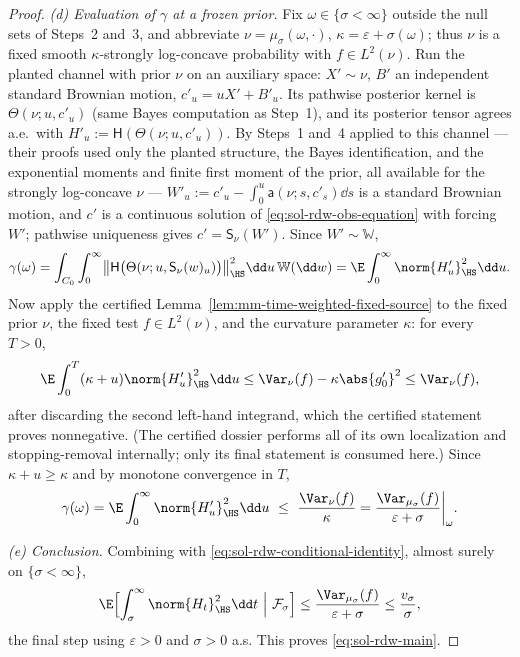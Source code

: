 \documentclass[../main.tex]{subfiles}
\begin{document}
\begin{proof}
\emph{(d) Evaluation of $\gamma$ at a frozen prior.}  Fix
$\omega\in\{\sigma<\infty\}$ outside the null sets of Steps~2 and~3, and abbreviate
$\nu=\mu_\sigma(\omega,\cdot)$, $\kappa=\varepsilon+\sigma(\omega)$; thus $\nu$ is a
fixed smooth $\kappa$-strongly log-concave probability with $f\in L^2(\nu)$.  Run the
planted channel with prior $\nu$ on an auxiliary space: $X'\sim\nu$, $B'$ an
independent standard Brownian motion, $c'_u=uX'+B'_u$.  Its pathwise posterior kernel
is $\Theta(\nu;u,c'_u)$ (same Bayes computation as Step~1), and its posterior tensor
agrees a.e.\ with $H'_u:=\mathsf H(\Theta(\nu;u,c'_u))$.  By Steps~1 and~4 applied to
this channel --- their proofs used only the planted structure, the Bayes
identification, and the exponential moments and finite first moment of the prior, all
available for the strongly log-concave $\nu$ ---
$W'_u:=c'_u-\int_0^u\mathsf a(\nu;s,c'_s)\dd s$ is a standard Brownian motion,
and $c'$ is a continuous solution of \eqref{eq:sol-rdw-obs-equation} with forcing
$W'$; pathwise uniqueness gives $c'=\mathsf S_\nu(W')$.  Since
$W'\sim\mathbb W$,
\[
  \gamma(\omega)
  =\int_{C_0}\int_0^\infty
    \bigl\|\mathsf H\bigl(\Theta(\nu;u,\mathsf S_\nu(w)_u)\bigr)\bigr\|^2_{\HS}
    \dd u\,\mathbb W(\dd w)
  =\E\int_0^\infty\norm{H'_u}_{\HS}^2\dd u .
\]
Now apply the certified Lemma~\ref{lem:mm-time-weighted-fixed-source} to the fixed
prior $\nu$, the fixed test $f\in L^2(\nu)$, and the curvature parameter $\kappa$:
for every $T>0$,
\[
  \E\int_0^T(\kappa+u)\norm{H'_u}_{\HS}^2\dd u
  \le\Var_\nu(f)-\kappa\abs{g'_0}^2\le\Var_\nu(f),
\]
after discarding the second left-hand integrand, which the certified statement proves
nonnegative.  (The certified dossier performs all of its own localization and
stopping-removal internally; only its final statement is consumed here.)  Since
$\kappa+u\ge\kappa$ and by monotone convergence in $T$,
\[
  \gamma(\omega)=\E\int_0^\infty\norm{H'_u}_{\HS}^2\dd u
  \ \le\ \frac{\Var_\nu(f)}{\kappa}
  =\frac{\Var_{\mu_\sigma}(f)}{\varepsilon+\sigma}\bigg|_{\omega}.
\]

\emph{(e) Conclusion.}  Combining with
\eqref{eq:sol-rdw-conditional-identity}, almost surely on $\{\sigma<\infty\}$,
\[
  \E\Bigl[\int_\sigma^\infty\norm{H_t}_{\HS}^2\dd t\ \Big|\ \mathcal F_\sigma\Bigr]
  \le\frac{\Var_{\mu_\sigma}(f)}{\varepsilon+\sigma}
  \le\frac{v_\sigma}{\sigma},
\]
the final step using $\varepsilon>0$ and $\sigma>0$ a.s.  This proves
\eqref{eq:sol-rdw-main}.
\end{proof}
\end{document}
